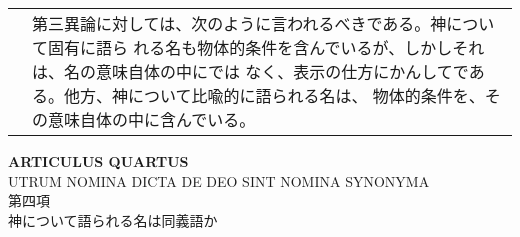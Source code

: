 \documentclass[paper=a4paper,fontsize=10pt,jafontsize=9pt,titlepage]{jlreq}
\begin{document}
\begin{longtable}{p{21em}p{21em}}
&

第三異論に対しては、次のように言われるべきである。神について固有に語ら
れる名も物体的条件を含んでいるが、しかしそれは、名の意味自体の中にでは
なく、表示の仕方にかんしてである。他方、神について比喩的に語られる名は、
物体的条件を、その意味自体の中に含んでいる。

\\

\end{longtable}

%
%

\newpage
{}

\begin{center}
{\Large {\bfseries ARTICULUS QUARTUS}}\\
{\large UTRUM NOMINA DICTA DE DEO SINT NOMINA SYNONYMA\\
第四項\\
神について語られる名は同義語か}
\end{center}
\end{document}
